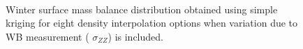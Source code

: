 \documentclass{sfuthesis}
\begin{document}
\begin{appendices}
\begin{figure}
	\centering
	\\
	\caption[]{Winter surface mass balance distribution obtained using simple kriging for eight density interpolation options when variation due to WB measurement ( $\sigma_{ZZ}$) is included. }
	\label{fig:WSMB_SK_Distributionzz}
\end{figure}
\begin{figure}
	\centering
	\\

\end{figure}
\end{appendices}
\end{document}
